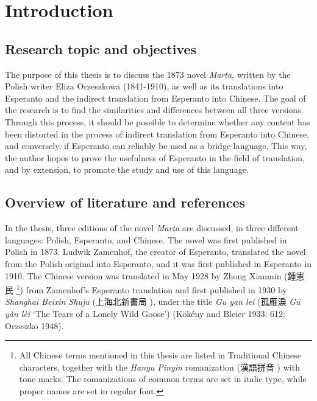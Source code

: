 \chapter{Introduction}

\section{Research topic and objectives}
The purpose of this thesis is to discuss the 1873 novel \textit{Marta}, written by the Polish writer Eliza Orzeszkowa (1841-1910), as well as its translations into Esperanto and the indirect translation from Esperanto into Chinese.
The goal of the research is to find the similarities and differences between all three versions. %
Through this process, it should be possible to determine whether any content has been distorted in the process of indirect translation from Esperanto into Chinese, and conversely, if Esperanto can reliably be used as a bridge language.
This way, the author hopes to prove the usefulness of Esperanto in the field of translation, and by extension, to promote the study and use of this language.

\section{Overview of literature and references}
In the thesis, three editions of the novel \textit{Marta} are discussed, in three different languages: Polish, Esperanto, and Chinese.
The novel was first published in Polish in 1873.
Ludwik Zamenhof, the creator of Esperanto, translated the novel from the Polish original into Esperanto, and it was first published in Esperanto in 1910.
The Chinese version was translated in May 1928 by Zhong Xianmin (鍾憲民 %
\footnote{All Chinese terms mentioned in this thesis are listed in Traditional Chinese characters, together with the \textit{Hanyu Pinyin} romanization (漢語拼音 ) with tone marks. The romanizations of common terms are set in italic type, while proper names are set in regular font.}) %
from Zamenhof's Esperanto translation and first published in 1930 by \textit{Shanghai Beixin Shuju} (上海北新書局 ), under the title \textit{Gu yan lei} (孤雁淚 \textit{Gū yàn lèi} `The Tears of a Lonely Wild Goose')
(Kökény and Bleier 1933: 612; Orzeszko 1948).

